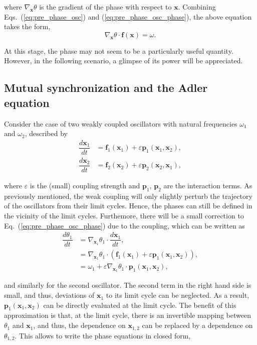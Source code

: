 \noindent where $\nabla_\mathbf{x} \theta$ is the gradient of the phase with respect to $\mathbf{x}$. Combining
Eqs.~(\ref{eq:pre_phase_osc}) and (\ref{eq:pre_phase_osc_phase}), the above equation takes the form,
\begin{equation}
    \nabla_\mathbf{x} \theta \cdot \mathbf{f(\mathbf{x})} = \omega.
\end{equation}


At this stage, the phase may not seem to be a particularly useful quantity. However, in the following
scenario, a glimpse of its power will be appreciated.

\subsection{Mutual synchronization and the Adler equation}

Consider the case of two weakly coupled oscillators 
with natural frequencies $\omega_1$ and $\omega_2$, described by
\begin{align}
    \dfrac{d\mathbf{x}_1}{dt} &= \mathbf{f}_1(\mathbf{x}_1) + \varepsilon \mathbf{p}_1(\mathbf{x}_1, \mathbf{x}_2), \\
    \dfrac{d\mathbf{x}_2}{dt} &= \mathbf{f}_2(\mathbf{x}_2) + \varepsilon \mathbf{p}_2(\mathbf{x}_2, \mathbf{x}_1),
\end{align}

\noindent where $\varepsilon$ is the (small) coupling strength and $\mathbf{p}_1$, $\mathbf{p}_2$ are the interaction terms.
As previously mentioned, the weak coupling will only slightly perturb the trajectory of the oscillators
from their limit cycles. Hence, the phases can still be defined in the vicinity of the limit cycles. Furthemore,
there will be a small correction to Eq.~(\ref{eq:pre_phase_osc_phase}) due to the coupling, which can be written as
\begin{align}
    \dfrac{d\theta_1}{dt} &= \nabla_{\mathbf{x}_1} \theta_1 \cdot \dfrac{d\mathbf{x}_1}{dt}, \nonumber \\
                    &= \nabla_{\mathbf{x}_1} \theta_1 \cdot (\mathbf{f}_1(\mathbf{x}_1) + \varepsilon \mathbf{p}_1(\mathbf{x}_1, \mathbf{x}_2)), \nonumber \\
                    &= \omega_1 + \varepsilon \nabla_{\mathbf{x}_1} \theta_1 \cdot \mathbf{p}_1(\mathbf{x}_1, \mathbf{x}_2),
\end{align}

\noindent and similarly for the second oscillator. The second term in the right hand side is small, and thus, deviations
of $\mathbf{x}_1$ to its limit cycle can be neglected. As a result, $\mathbf{p}_1(\mathbf{x}_1, \mathbf{x}_2)$ can be directly
evaluated at the limit cycle. The benefit of this approximation is that, at the limit cycle, there is
an invertible mapping between $\theta_1$ and $\mathbf{x}_1$, and thus, the dependence on $\mathbf{x}_{1,2}$
can be replaced by a dependence on $\theta_{1,2}$. This allows to write the phase equations in closed form,

